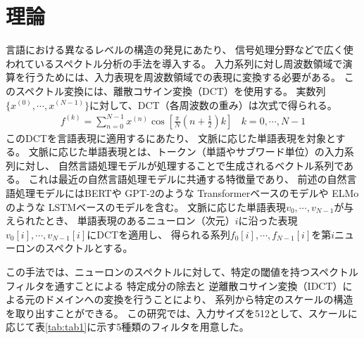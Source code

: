 \documentclass{jsarticle}
\begin{document}
\section{理論}
言語における異なるレベルの構造の発見にあたり、
信号処理分野などで広く使われているスペクトル分析の手法を導入する。
入力系列に対し周波数領域で演算を行うためには、入力表現を周波数領域での表現に変換する必要がある。
このスペクトル変換には、離散コサイン変換（DCT）を使用する。
実数列$\{x^{(0)},\cdots, x^{(N-1)}\}$に対して、DCT（各周波数の重み）は次式で得られる。
\begin{eqnarray}
  f^{(k)}= \sum_{n=0}^{N-1}x^{(n)}\cos{[\frac{\pi}{N}(n+\frac{1}{2})k]} \ \ \ \ k=0,\cdots,N-1
\end{eqnarray}
このDCTを言語表現に適用するにあたり、
文脈に応じた単語表現を対象とする。
文脈に応じた単語表現とは、トークン（単語やサブワード単位）の入力系列に対し、
自然言語処理モデルが処理することで生成されるベクトル系列である。
これは最近の自然言語処理モデルに共通する特徴量であり、
前述の自然言語処理モデルにはBERT\cite{devlin2019bert}や
GPT-2\cite{radford2018gpt2}のような
Transformer\cite{vaswani2017attention}ベースのモデルや
ELMo\cite{peters-etal-2018-deep}のような
LSTM\cite{hochreiter1997long}ベースのモデルを含む。
文脈に応じた単語表現$v_0,\cdots,v_{N-1}$が与えられたとき、
単語表現のあるニューロン（次元）$i$に沿った表現$v_0[i],\cdots,v_{N-1}[i]$にDCTを適用し、
得られる系列$f_0[i],\cdots,f_{N-1}[i]$を第$i$ニューロンのスペクトルとする。

この手法では、ニューロンのスペクトルに対して、特定の閾値を持つスペクトルフィルタを通すことによる
特定成分の除去と
逆離散コサイン変換（IDCT）による元のドメインへの変換を行うことにより、
系列から特定のスケールの構造を取り出すことができる。
この研究では、入力サイズを512として、スケールに応じて表\ref{tab:tab1}に示す5種類のフィルタを用意した。
\end{document}
